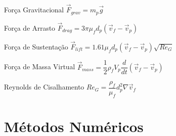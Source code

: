 \documentclass{beamer}
\begin{document}
\begin{frame}
  \frametitle{\subsecname}
  
  \begin{minipage}{.45\textwidth}
    \begin{block}{Força Gravitacional}
      \centering
      $\vec{F}_{grav} = m_p \vec{g}$
    \end{block}
    
    \begin{block}{Força de Arrasto}
      \centering
      $\vec{F}_{drag} = 3 \pi \mu_f d_p \left(\vec{v}_{f} - \vec{v}_{p} \right)$
    \end{block}
  \end{minipage}
  \hfill
  \begin{minipage}{.51\textwidth}
    \begin{block}{Força de Sustentação}
      \centering
      $\vec{F}_{lift} = 1.61 \mu_f d_p \left(\vec{v}_{f} - \vec{v}_{p} \right) \sqrt{{Re}_G}$
    \end{block}
    
    \begin{block}{Força de Massa Virtual}
      \centering
      $\vec{F}_{mass} = \dfrac{1}{2} \rho_f V_p \dfrac{d}{dt}\left(\vec{v}_{f} - \vec{v}_{p} \right)$
    \end{block}
  \end{minipage}
  
  \begin{block}{Reynolds de Cisalhamento}
    \centering
    $Re_G = \dfrac{\rho_f}{\mu_f} d_p^2 \nabla \vec{v}_f$
  \end{block}
\end{frame}

\section{Métodos Numéricos}
\end{document}
